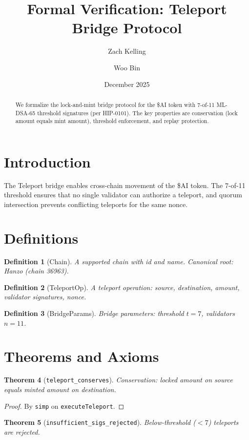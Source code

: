 \documentclass[11pt]{article}
\title{Formal Verification: Teleport Bridge Protocol}
\author{Zach Kelling \and Woo Bin}
\date{December 2025}
\newtheorem{theorem}{Theorem}
\newtheorem{definition}[theorem]{Definition}
\begin{document}
\maketitle

\begin{abstract}
We formalize the lock-and-mint bridge protocol for the \$AI token with 7-of-11 ML-DSA-65 threshold signatures (per HIP-0101). The key properties are conservation (lock amount equals mint amount), threshold enforcement, and replay protection.
\end{abstract}

\section{Introduction}
The Teleport bridge enables cross-chain movement of the \$AI token. The 7-of-11 threshold ensures that no single validator can authorize a teleport, and quorum intersection prevents conflicting teleports for the same nonce.

\section{Definitions}
\begin{definition}[Chain]
A supported chain with id and name. Canonical root: Hanzo (chain 36963).
\end{definition}

\begin{definition}[TeleportOp]
A teleport operation: source, destination, amount, validator signatures, nonce.
\end{definition}

\begin{definition}[BridgeParams]
Bridge parameters: threshold $t=7$, validators $n=11$.
\end{definition}


\section{Theorems and Axioms}
\begin{theorem}[\texttt{teleport\_conserves}]
Conservation: locked amount on source equals minted amount on destination.
\end{theorem}
\begin{proof}
By \texttt{simp} on \texttt{executeTeleport}.
\end{proof}

\begin{theorem}[\texttt{insufficient\_sigs\_rejected}]
Below-threshold ($< 7$) teleports are rejected.
\end{theorem}
\end{document}
